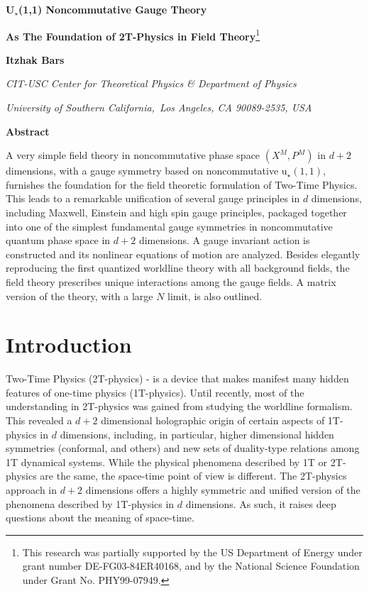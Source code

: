 \documentclass[a4paper,12pt]{article}
\begin{document}

{\vskip0.5cm}

\begin{center}
{\Large \textbf{U}}$_{\star }${\Large \textbf{(1,1) Noncommutative Gauge
Theory }}

{\Large \textbf{As The Foundation of 2T-Physics in Field Theory}}{\footnote{%
This research was partially supported by the US Department of Energy under
grant number DE-FG03-84ER40168, and by the National Science Foundation under
Grant No. PHY99-07949.}}

\bigskip

{\vskip0.5cm}

\textbf{Itzhak Bars}

{\vskip0.5cm}

\textsl{CIT-USC Center for Theoretical Physics \& Department of Physics}

\textsl{University of Southern California,\ Los Angeles, CA 90089-2535, USA}

{\vskip0.5cm}

\textbf{Abstract}
\end{center}

A very simple field theory in noncommutative phase space $(X^{M},P^{M})$ in $%
d+2$ dimensions, with a gauge symmetry based on noncommutative u$_{\star
}\left( 1,1\right) $, furnishes the foundation for the field theoretic
formulation of Two-Time Physics$.$ This leads to a remarkable unification of
several gauge principles in $d$ dimensions, including Maxwell, Einstein and
high spin gauge principles, packaged together into one of the simplest
fundamental gauge symmetries in noncommutative quantum phase space in $d+2$
dimensions. A gauge invariant action is constructed and its nonlinear
equations of motion are analyzed. Besides elegantly reproducing the first
quantized worldline theory with all background fields, the field theory
prescribes unique interactions among the gauge fields. A matrix version of
the theory, with a large $N$ limit, is also outlined.

\section{Introduction}

Two-Time Physics (2T-physics) \cite{survey2T}-\cite{NCSp} is a device that
makes manifest many hidden features of one-time physics (1T-physics). Until
recently, most of the understanding in 2T-physics was gained from studying
the worldline formalism. This revealed a $d+2$ dimensional holographic
origin of certain aspects of 1T-physics in $d$ dimensions, including, in
particular, higher dimensional hidden symmetries (conformal, and others) and
new sets of duality-type relations among 1T dynamical systems. While the
physical phenomena described by 1T or 2T-physics are the same, the
space-time point of view is different. The 2T-physics approach in $d+2$
dimensions offers a highly symmetric and unified version of the phenomena
described by 1T-physics in $d$ dimensions. As such, it raises deep questions
about the meaning of space-time.
\end{document}
